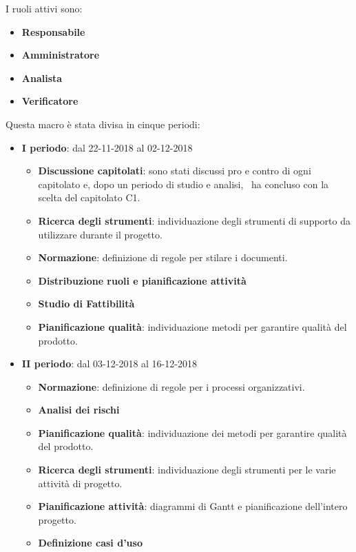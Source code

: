         I ruoli attivi sono:
        \begin{itemize}
            \item \textbf{Responsabile}
            \item \textbf{Amministratore}
            \item \textbf{Analista}
            \item \textbf{Verificatore}
        \end{itemize}
        Questa macro è stata divisa in cinque periodi:
		\begin{itemize}
			\item \textbf{I periodo}: dal 22-11-2018 al 02-12-2018
			\begin{itemize}
    	        \item \textbf{Discussione capitolati}: sono stati discussi pro e contro di ogni capitolato e, dopo un periodo di
				studio e analisi, \gruppo\ ha concluso con la scelta del capitolato C1.
    	        \item \textbf{Ricerca degli strumenti}: individuazione degli strumenti di supporto da utilizzare durante il progetto.
    	        \item \textbf{Normazione}: definizione di regole per stilare i documenti.
    	        \item \textbf{Distribuzione ruoli e pianificazione attività}
       	        \item \textbf{Studio di Fattibilità}
       	        \item \textbf{Pianificazione qualità}: individuazione metodi per garantire qualità del prodotto.
			\end{itemize}
			\newpage
			\item \textbf{II periodo}: dal 03-12-2018 al 16-12-2018
			\begin{itemize}
    	        \item \textbf{Normazione}: definizione di regole per i processi organizzativi.
    	        \item \textbf{Analisi dei rischi}
    	        \item \textbf{Pianificazione qualità}: individuazione dei metodi per garantire qualità del prodotto.
       	        \item \textbf{Ricerca degli strumenti}: individuazione degli strumenti per le varie attività di progetto.
       	        \item \textbf{Pianificazione attività}: diagrammi di Gantt e pianificazione dell'intero progetto.
       	        \item \textbf{Definizione casi d'uso}

\end{itemize}
\end{itemize}
